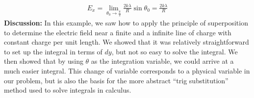 \begin{example}
\begin{align*}
E_x=\lim_{\theta_0\to\frac{\pi}{2}}\frac{2k\lambda}{R}\sin\theta_0=\frac{2k\lambda}{R}
\end{align*}
\textbf{Discussion:} In this example, we saw how to apply the principle of superposition to determine the electric field near a finite and a infinite line of charge with constant charge per unit length. We showed that it was relatively straightforward to set up the integral in terms of $dy$, but not so easy to solve the integral. We then showed that by using $\theta$ as the integration variable, we could arrive at a much easier integral. This change of variable corresponds to a physical variable in our problem, but is also the basis for the more abstract ``trig substitution'' method used to solve integrals in calculus.
\end{example}
\vspace{-0.6cm}
